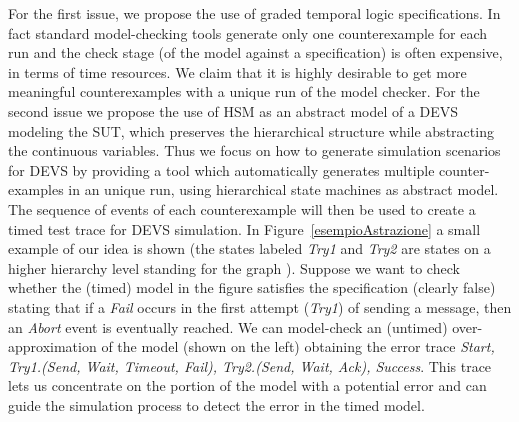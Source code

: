 \documentclass[letterpaper,twocolumn,10pt]{article}
\begin{document}
For the first issue, we propose the use of graded temporal logic specifications. In fact
standard model-checking tools generate only one counterexample for each
run and the check stage (of the model against a specification) is often expensive, in terms
of time resources.
We claim that it is highly desirable to get more meaningful counterexamples with a unique
run of the model checker.
For the second issue we propose the use of HSM as an abstract model of a DEVS
modeling the SUT, which preserves the
hierarchical structure while abstracting the continuous variables.
Thus we focus on how to generate simulation scenarios for
DEVS by providing a tool  which automatically generates multiple
counter-examples in an unique run, using hierarchical state machines as abstract model.
The sequence of events of each counterexample will
then be used to create a timed test trace for DEVS simulation.
In Figure~\ref{esempioAstrazione} a small example of our idea is shown
(the states labeled {\em Try1} and {\em Try2} are states on a higher hierarchy level
standing for the graph ).
Suppose we want to check whether the (timed) model in the figure satisfies the specification
(clearly false) stating that if a {\em Fail} occurs in the first attempt ({\em Try1}) of sending a message,
then an {\em Abort} event is eventually reached.
We can model-check an (untimed) over-approximation of the model (shown on the left)
obtaining the error trace {\em Start, Try1.(Send, Wait, Timeout, Fail), Try2.(Send, Wait, Ack), Success}.
This trace lets us concentrate on the portion of the model with a
potential error and can guide the simulation process to detect the error in the timed model.
\end{document}
